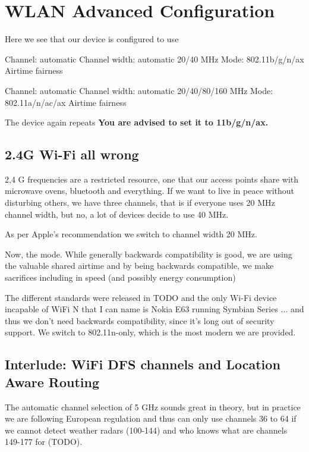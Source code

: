 \documentclass[../wifi-security.tex]{subfiles}
\begin{document}

\section{WLAN Advanced Configuration}

Here we see that our device is configured to use

Channel: automatic
Channel width: automatic 20/40 MHz
Mode: 802.11b/g/n/ax
Airtime fairness

Channel: automatic
Channel width: automatic 20/40/80/160 MHz
Mode: 802.11a/n/ac/ax
Airtime fairness

The device again repeats \textbf{You are advised to set it to 11b/g/n/ax.}

\subsection{2.4G Wi-Fi all wrong}

2,4 G frequencies are a restricted resource, one that our access points share with microwave ovens, bluetooth and everything. If we want to live in peace without disturbing others, we have three channels, that is if everyone uses 20 MHz channel width, but no, a lot of devices decide to use 40 MHz.

As per Apple's recommendation we switch to channel width 20 MHz. %

Now, the mode. While generally backwards compatibility is good, we are using the valuable shared airtime and by being backwards compatible, we make sacrifices including in speed (and possibly energy consumption) %

The different standards were released in TODO and the only Wi-Fi device incapable of WiFi N that I can name is Nokia E63 running Symbian Series ... and thus we don't need backwards compatibility, since it's long out of security support. We switch to 802.11n-only, which is the most modern we are provided.

\subsection{Interlude: WiFi DFS channels and Location Aware Routing}

The automatic channel selection of 5 GHz sounds great in theory, but in practice we are following European regulation and thus can only use channels 36 to 64 if we cannot detect weather radars (100-144) \autocite{metisdfs} and who knows what are channels 149-177 for (TODO).
\end{document}
